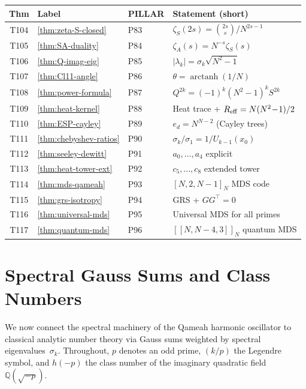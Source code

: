 \documentclass[aps,prd,twocolumn,superscriptaddress,floatfix,nofootinbib]{revtex4-2}
\theoremstyle{definition}
\theoremstyle{remark}
\begin{document}
\begin{center}
\renewcommand{\arraystretch}{1.15}
\begin{tabular}{@{}clll@{}}
\toprule
\textbf{Thm} & \textbf{Label} & \textbf{PILLAR} & \textbf{Statement (short)} \\
\midrule
T104 & \ref{thm:zeta-S-closed}    & P83 & $\zeta_S(2s) = \binom{2s}{s}/N^{2s-1}$ \\
T105 & \ref{thm:SA-duality}       & P84 & $\zeta_A(s) = N^{-s}\zeta_S(s)$ \\
T106 & \ref{thm:Q-imag-eig}       & P85 & $|\lambda_k| = \sigma_k\sqrt{N^2-1}$ \\
T107 & \ref{thm:Cl11-angle}       & P86 & $\theta = \operatorname{arctanh}(1/N)$ \\
T108 & \ref{thm:power-formula}    & P87 & $Q^{2k} = (-1)^k(N^2\!-\!1)^k S^{2k}$ \\
T109 & \ref{thm:heat-kernel}      & P88 & Heat trace + $R_{\rm eff}=N(N^2\!-\!1)/2$ \\
T110 & \ref{thm:ESP-cayley}       & P89 & $e_d = N^{N-2}$ (Cayley trees) \\
T111 & \ref{thm:chebyshev-ratios} & P90 & $\sigma_k/\sigma_1 = 1/U_{k-1}(x_0)$ \\
T112 & \ref{thm:seeley-dewitt}    & P91 & $a_0,\ldots,a_4$ explicit \\
T113 & \ref{thm:heat-tower-ext}   & P92 & $c_5,\ldots,c_8$ extended tower \\
T114 & \ref{thm:mds-qameah}       & P93 & $[N,2,N\!-\!1]_N$ MDS code \\
T115 & \ref{thm:grs-isotropy}     & P94 & GRS + $G G^{\!\top}=0$ \\
T116 & \ref{thm:universal-mds}    & P95 & Universal MDS for all primes \\
T117 & \ref{thm:quantum-mds}      & P96 & $[\![N,N\!-\!4,3]\!]_N$ quantum MDS \\
\bottomrule
\end{tabular}
\end{center}

\section{Spectral Gauss Sums and Class Numbers}\label{sec:spectral-gauss}

\noindent
We now connect the spectral machinery of the Qameah harmonic oscillator to
classical analytic number theory via Gauss sums weighted by spectral
eigenvalues~$\sigma_k$.  Throughout, $p$ denotes an odd prime,
$(k/p)$ the Legendre symbol, and $h(-p)$ the class number of the imaginary
quadratic field $\mathbb{Q}(\sqrt{-p})$.
\end{document}
